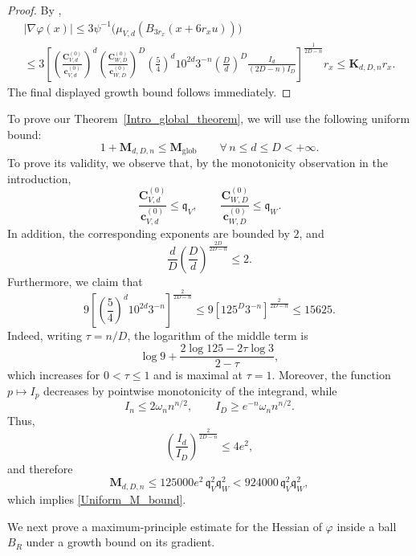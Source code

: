 \documentclass[11pt,a4paper,reqno]{amsart}
\numberwithin{equation}{section}
\theoremstyle{definition}
\newcommand{\<}{\ensuremath \leq}
\renewcommand{\>}{\ensuremath \geq}
\newcommand{\CVp}[1]{\mathbf{C}_{V,#1}}
\newcommand{\CWp}[1]{\mathbf{C}_{W,#1}}
\newcommand{\cVp}[1]{\mathbf{c}_{V,#1}}
\newcommand{\cWp}[1]{\mathbf{c}_{W,#1}}
\begin{document}
\begin{proof}
By \cite[Theorem 2.3]{Fathi},
\begin{multline}
|\nabla\varphi(x)|
\le
3\psi^{-1}\bigl(\mu_{V,d}(B_{3r_x}(x+6r_xu))\bigr)\\
\le
3\left[
\left(\frac{\CVp{d}^{(0)}}{\cVp{d}^{(0)}}\right)^d
\left(\frac{\CWp{D}^{(0)}}{\cWp{D}^{(0)}}\right)^D
\left(\frac{5}{4}\right)^d10^{2d}3^{-n}
\left(\frac{D}{d}\right)^D 
\frac{I_d}{(2D-n)I_D}
\right]^{\frac{1}{2D-n}}
r_x \le
\mathbf{K}_{d,D,n}r_x.
\end{multline}
The final displayed growth bound follows immediately.
\end{proof}

To prove our Theorem~\ref{Intro_global_theorem}, we will use the following uniform bound:
\begin{equation}\label{Uniform_M_bound}
    1+\mathbf M_{d,D,n}\le \mathbf M_{\mathrm{glob}}
    \qquad \forall\, n\le d\le D<+\infty.
\end{equation}
To prove its validity, we observe that, by the monotonicity observation in the introduction,
\[
    \frac{\CVp{d}^{(0)}}{\cVp{d}^{(0)}}\le \mathfrak q_V,
    \qquad
    \frac{\CWp{D}^{(0)}}{\cWp{D}^{(0)}}\le \mathfrak q_W.
\]
In addition, the corresponding exponents are bounded by $2$, and
\[
    \frac dD\left(\frac Dd\right)^{\frac{2D}{2D-n}}\le 2.
\]
Furthermore, we claim that
\[
    9\left[\left(\frac{5}{4}\right)^d10^{2d}3^{-n}\right]^{\frac{2}{2D-n}}
    \le
    9\left[125^D3^{-n}\right]^{\frac{2}{2D-n}}
    \le
    15625.
\]
Indeed, writing $\tau=n/D$, the logarithm of the middle term is
\[
    \log 9+\frac{2\log 125-2\tau\log 3}{2-\tau},
\]
which increases for $0<\tau\le1$ and is maximal at $\tau=1$.
Moreover, the function $p\mapsto I_p$ decreases by pointwise monotonicity of the integrand, while
\[
    I_n\le 2\omega_n n^{n/2},
    \qquad
    I_D\ge e^{-n}\omega_n n^{n/2}.
\]
Thus,
\[
    \left(\frac{I_d}{I_D}\right)^{\frac{2}{2D-n}}
    \le 4e^2,
\]
and therefore
\[
    \mathbf M_{d,D,n}
    \le
    125000e^2\,\mathfrak q_V^2\mathfrak q_W^2
    <
    924000\, \mathfrak q_V^2\mathfrak q_W^2 ,
\]
which implies \cref{Uniform_M_bound}.

We next prove a maximum-principle estimate for the Hessian of $\varphi$ inside a ball $B_R$ under a growth bound on its gradient.
\end{document}
